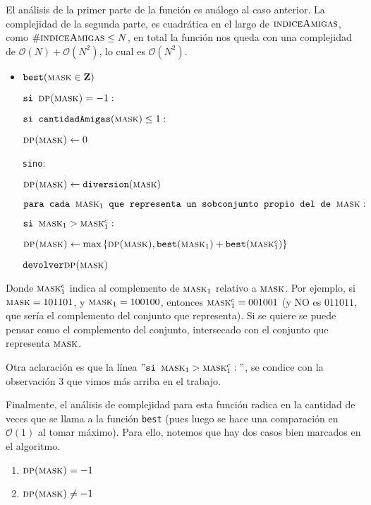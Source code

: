 	El análisis de la primer parte de la función es análogo al caso anterior. La complejidad de la segunda parte, es cuadrática en el largo de $\textsc{indiceAmigas}$, como $\# \textsc{indiceAmigas} \leq N$, en total la función nos queda con una complejidad de $\mathcal{O}(N) + \mathcal{O}(N^2)$, lo cual es $\mathcal{O}(N^2)$.
	
\begin{itemize}
	
	\item $\texttt{best}(\textsc{mask} \in \mathbf{Z})$
	
	$\texttt{si } \textsc{dp(mask)} = -1:$
	
	\quad 	$\texttt{si cantidadAmigas}(\textsc{mask}) \leq 1:$
	
	\quad \quad $ \textsc{dp(mask)} \leftarrow 0$
	
	\quad \texttt{sino}:
	
	\quad \quad $ \textsc{dp(mask)} \leftarrow \texttt{diversion}(\textsc{mask})$
	
	\quad \quad $ \texttt{para cada } \textsc{mask}_1 \texttt{ que representa un sobconjunto propio del de } \textsc{mask}:$
	
	\quad \quad \quad $\texttt{si } \textsc{mask}_1 > \textsc{mask}_1^c:$
	
	\quad \quad \quad \quad $\textsc{dp(mask)} \leftarrow \text{max} \left  \{ \textsc{dp(mask)}, \texttt{best}(\textsc{mask}_1) + \texttt{best}(\textsc{mask}_1^c)  \right \} $
	
	$\texttt{devolver} \textsc{dp(mask)}$
	
\end{itemize}	

	Donde $\textsc{mask}_1^c$ indica al complemento de $\textsc{mask}_1$ relativo a $\textsc{mask}$. Por ejemplo, si $\textsc{mask} = 101101$, y $\textsc{mask}_1 = 100100$, entonces $\textsc{mask}_1^c = 001001$ (y NO es $011011$, que sería el complemento del conjunto que representa). Si se quiere se puede pensar como el complemento del conjunto, intersecado con el conjunto que representa $\textsc{mask}$.
	
	Otra aclaración es que la línea $" \texttt{si } \textsc{mask}_1 > \textsc{mask}_1^c:"$, se condice con la observación 3 que vimos más arriba en el trabajo.
	
	Finalmente, el análisis de complejidad para esta función radica en la cantidad de veces que se llama a la función \texttt{best} (pues luego se hace una comparación en $\mathcal{O}(1)$ al tomar máximo). Para ello, notemos que hay dos casos bien marcados en el algoritmo. 
	\begin{enumerate}
		\item $\textsc{dp(mask)} = -1$
		\item $\textsc{dp(mask)} \neq -1$
	\end{enumerate}


